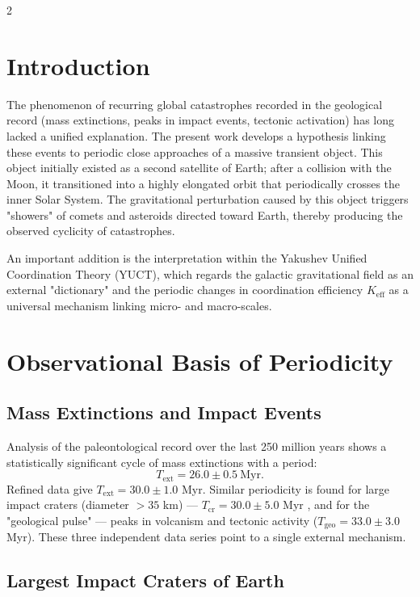 \documentclass[11pt,a4paper]{article}
\begin{document}
	\begin{multicols}{2}
		
		\section{Introduction}
		
		The phenomenon of recurring global catastrophes recorded in the geological record (mass extinctions, peaks in impact events, tectonic activation) has long lacked a unified explanation. The present work develops a hypothesis linking these events to periodic close approaches of a massive transient object. This object initially existed as a second satellite of Earth; after a collision with the Moon, it transitioned into a highly elongated orbit that periodically crosses the inner Solar System. The gravitational perturbation caused by this object triggers "showers" of comets and asteroids directed toward Earth, thereby producing the observed cyclicity of catastrophes.
		
		An important addition is the interpretation within the Yakushev Unified Coordination Theory (YUCT), which regards the galactic gravitational field as an external "dictionary" and the periodic changes in coordination efficiency \(K_{\mathrm{eff}}\) as a universal mechanism linking micro- and macro-scales.
		
		\section{Observational Basis of Periodicity}
		
		\subsection{Mass Extinctions and Impact Events}
		
		Analysis of the paleontological record over the last 250 million years \cite{Raup1984, Melott2010} shows a statistically significant cycle of mass extinctions with a period:
		\[
		T_{\text{ext}} = 26.0 \pm 0.5\ \text{Myr}.
		\]
		Refined data give \(T_{\text{ext}} = 30.0 \pm 1.0\) Myr. Similar periodicity is found for large impact craters (diameter \(>35\) km) — \(T_{\text{cr}} = 30.0 \pm 5.0\) Myr \cite{RampinoStothers1984}, and for the "geological pulse" — peaks in volcanism and tectonic activity (\(T_{\text{geo}} = 33.0 \pm 3.0\) Myr). These three independent data series point to a single external mechanism.
		
		\subsection{Largest Impact Craters of Earth}
		

\end{multicols}
\end{document}
